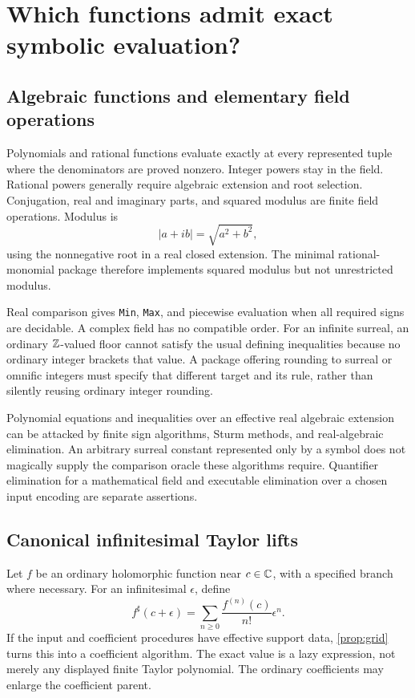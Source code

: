 \documentclass[11pt,letterpaper]{article}
\theoremstyle{definition}\newtheorem{definition}[theorem]{Definition}
\theoremstyle{remark}\newtheorem{remark}[theorem]{Remark}
\newcommand{\code}[1]{\texttt{#1}}
\numberwithin{equation}{section}\setcounter{tocdepth}{2}
\begin{document}
\section{Which functions admit exact symbolic evaluation?}\label{sec:functions}
\subsection{Algebraic functions and elementary field operations}
Polynomials and rational functions evaluate exactly at every represented tuple where the denominators are proved nonzero. Integer powers stay in the field. Rational powers generally require algebraic extension and root selection. Conjugation, real and imaginary parts, and squared modulus are finite field operations. Modulus is
\[
 |a+ib|=\sqrt{a^2+b^2},
\]
using the nonnegative root in a real closed extension. The minimal rational-monomial package therefore implements squared modulus but not unrestricted modulus.

Real comparison gives \code{Min}, \code{Max}, and piecewise evaluation when all required signs are decidable. A complex field has no compatible order. For an infinite surreal, an ordinary $\mathbb Z$-valued floor cannot satisfy the usual defining inequalities because no ordinary integer brackets that value. A package offering rounding to surreal or omnific integers must specify that different target and its rule, rather than silently reusing ordinary integer rounding.

Polynomial equations and inequalities over an effective real algebraic extension can be attacked by finite sign algorithms, Sturm methods, and real-algebraic elimination. An arbitrary surreal constant represented only by a symbol does not magically supply the comparison oracle these algorithms require. Quantifier elimination for a mathematical field and executable elimination over a chosen input encoding are separate assertions.

\subsection{Canonical infinitesimal Taylor lifts}
Let $f$ be an ordinary holomorphic function near $c\in\mathbb C$, with a specified branch where necessary. For an infinitesimal $\epsilon$, define
\begin{equation}\label{eq:Taylorlift}
 f^\sharp(c+\epsilon)=
 \sum_{n\ge0}\frac{f^{(n)}(c)}{n!}\epsilon^n.
\end{equation}
If the input and coefficient procedures have effective support data, \cref{prop:grid} turns this into a coefficient algorithm. The exact value is a lazy expression, not merely any displayed finite Taylor polynomial. The ordinary coefficients may enlarge the coefficient parent.
\end{document}
